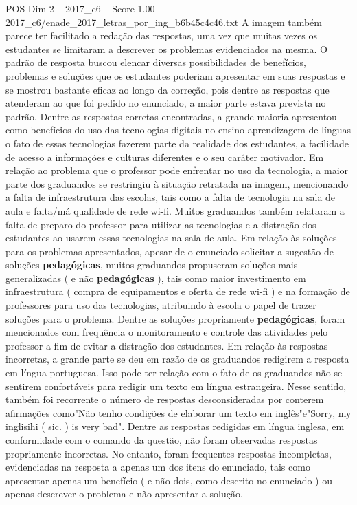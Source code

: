 \begin{textsample}{POS Dim 2 – 2017\_c6 – Score 1.00 – 2017\_c6/enade\_2017\_letras\_por\_ing\_b6b45c4c46.txt}
A imagem também parece ter facilitado a redação das respostas, uma vez que muitas vezes os estudantes se limitaram a descrever os problemas evidenciados na mesma.
O padrão de resposta buscou elencar diversas possibilidades de benefícios, problemas e soluções que os estudantes poderiam apresentar em suas respostas e se mostrou bastante eficaz ao longo da correção, pois dentre as respostas que atenderam ao que foi pedido no enunciado, a maior parte estava prevista no padrão.
Dentre as respostas corretas encontradas, a grande maioria apresentou como benefícios do uso das tecnologias digitais no ensino-aprendizagem de línguas o fato de essas tecnologias fazerem parte da realidade dos estudantes, a facilidade de acesso a informações e culturas diferentes e o seu caráter motivador.
Em relação ao problema que o professor pode enfrentar no uso da tecnologia, a maior parte dos graduandos se restringiu à situação retratada na imagem, mencionando a falta de infraestrutura das escolas, tais como a falta de tecnologia na sala de aula e falta/má qualidade de rede wi-fi.
Muitos graduandos também relataram a falta de preparo do professor para utilizar as tecnologias e a distração dos estudantes ao usarem essas tecnologias na sala de aula.
Em relação às soluções para os problemas apresentados, apesar de o enunciado solicitar a sugestão de soluções \textbf{pedagógicas}, muitos graduandos propuseram soluções mais generalizadas ( e não \textbf{pedagógicas} ), tais como maior investimento em infraestrutura ( compra de equipamentos e oferta de rede wi-fi ) e na formação de professores para uso das tecnologias, atribuindo à escola o papel de trazer soluções para o problema.
Dentre as soluções propriamente \textbf{pedagógicas}, foram mencionados com frequência o monitoramento e controle das atividades pelo professor a fim de evitar a distração dos estudantes.
Em relação às respostas incorretas, a grande parte se deu em razão de os graduandos redigirem a resposta em língua portuguesa.
Isso pode ter relação com o fato de os graduandos não se sentirem confortáveis para redigir um texto em língua estrangeira.
Nesse sentido, também foi recorrente o número de respostas desconsideradas por conterem afirmações como"Não tenho condições de elaborar um texto em inglês"e"Sorry, my inglisihi ( sic. ) is very bad".
Dentre as respostas redigidas em língua inglesa, em conformidade com o comando da questão, não foram observadas respostas propriamente incorretas.
No entanto, foram frequentes respostas incompletas, evidenciadas na resposta a apenas um dos itens do enunciado, tais como apresentar apenas um benefício ( e não dois, como descrito no enunciado ) ou apenas descrever o problema e não apresentar a solução.

\end{textsample}
